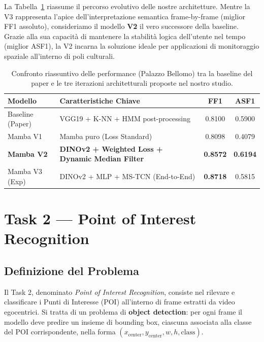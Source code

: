 \documentclass[a4paper,12pt]{report}
\begin{document}
La Tabella~\ref{tab:task1_comparison} riassume il percorso evolutivo delle nostre architetture. Mentre la V3 rappresenta l'apice dell'interpretazione semantica frame-by-frame (miglior FF1 assoluto), consideriamo il modello \textbf{V2} il vero successore della baseline. Grazie alla sua capacità di mantenere la stabilità logica dell'utente nel tempo (miglior ASF1), la V2 incarna la soluzione ideale per applicazioni di monitoraggio spaziale all'interno di poli culturali.

\begin{table}[htbp]
\centering
\caption{Confronto riassuntivo delle performance (Palazzo Bellomo) tra la baseline del paper e le tre iterazioni architetturali proposte nel nostro studio.}
\label{tab:task1_comparison}
\begin{tabular}{llcc}
\toprule
\textbf{Modello} & \textbf{Caratteristiche Chiave} & \textbf{FF1} & \textbf{ASF1} \\
\midrule
Baseline (Paper) & VGG19 + K-NN + HMM post-processing & 0.8100 & 0.5900 \\
Mamba V1 & Mamba puro (Loss Standard) & 0.8098 & 0.4079 \\
\textbf{Mamba V2} & \textbf{DINOv2 + Weighted Loss + Dynamic Median Filter} & \textbf{0.8572} & \textbf{0.6194} \\
Mamba V3 (Exp) & DINOv2 + MLP + MS-TCN (End-to-End) & \textbf{0.8718} & 0.5815 \\
\bottomrule
\end{tabular}
\end{table}


\chapter{Task 2 --- Point of Interest Recognition}

\section{Definizione del Problema}

Il Task 2, denominato \emph{Point of Interest Recognition}, consiste nel rilevare e classificare i Punti di Interesse (POI) all'interno di frame estratti da video egocentrici. 
Si tratta di un problema di \textbf{object detection}: per ogni frame il modello deve predire un insieme di bounding box, ciascuna associata alla classe del POI corrispondente, nella forma $(x_{\text{center}}, y_{\text{center}}, w, h, \text{class})$.
\end{document}
